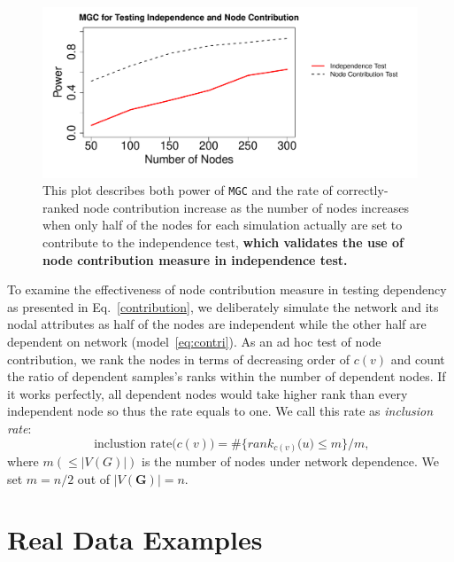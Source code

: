 \documentclass[12pt]{article}
\theoremstyle{definition}
\begin{document}
\begin{figure}
	\centering
	\includegraphics[width=0.6\linewidth, height = 0.3\linewidth]{../Figure/nodecontri.pdf}
	\caption{This plot describes both power of \texttt{MGC} and the rate of correctly-ranked node contribution increase as the number of nodes increases when only half of the nodes for each simulation actually are set to contribute to the independence test, \textbf{which validates the use of node contribution measure in independence test.}}
	\label{fig:contribution}
\end{figure}
To examine the effectiveness of node contribution measure in testing dependency as presented in Eq.~\ref{contribution}, we deliberately simulate the network and its nodal attributes as half of the nodes are independent while the other half are dependent on network (model~\ref{eq:contri}). As an ad hoc test of node contribution, we rank the nodes in terms of decreasing order of $c(v)$ and count the ratio of dependent samples's ranks within the number of dependent nodes. If it works perfectly, all dependent nodes would take higher rank than every independent node so thus the rate equals to one. We call this rate as \textit{inclusion rate}:
\begin{equation}
\mbox{ inclustion rate}\big(  c(v) \big) = \# \big\{  rank_{c(v)}\big(  u \big)  \leq  m  \big\}   /  m,
\label{eq:inclusion_rate}
\end{equation}
where $m (\leq |V(G)|)$ is the number of nodes under network dependence. We set $m=n/2$ out of $|V(\mathbf{G})| = n$.

\section{Real Data Examples}
\label{sec:real}
	
\end{document}
